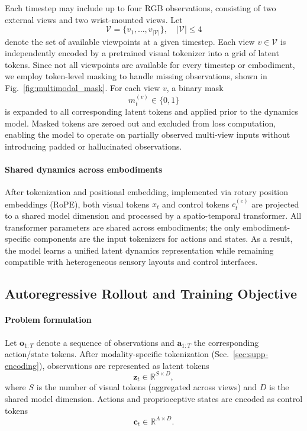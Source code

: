 Each timestep may include up to four RGB observations, consisting of two external views and two wrist-mounted views. Let
\[
\mathcal{V} = \{v_1, \dots, v_{|\mathcal{V}|}\}, \quad |\mathcal{V}| \leq 4
\]
denote the set of available viewpoints at a given timestep. Each view $v \in \mathcal{V}$ is independently encoded by a pretrained visual tokenizer into a grid of latent tokens. Since not all viewpoints are available for every timestep or embodiment, we employ token-level masking to handle missing observations, shown in Fig.~\ref{fig:multimodal_mask}. For each view $v$, a binary mask
\[
m_t^{(v)} \in \{0,1\}
\]
is expanded to all corresponding latent tokens and applied prior to the dynamics model. Masked tokens are zeroed out and excluded from loss computation, enabling the model to operate on partially observed multi-view inputs without introducing padded or hallucinated observations.




\paragraph{Shared dynamics across embodiments}
After tokenization and positional embedding, implemented via rotary position embeddings (RoPE), both visual tokens $x_t$ and control tokens $c_t^{(e)}$ are projected to a shared model dimension and processed by a spatio-temporal transformer. All transformer parameters are shared across embodiments; the only embodiment-specific components are the input tokenizers for actions and states. As a result, the model learns a unified latent dynamics representation while remaining compatible with heterogeneous sensory layouts and control interfaces.







\subsection{Autoregressive Rollout and Training Objective}
\label{sec:supp-rollout-loss}

\paragraph{Problem formulation}
Let $\mathbf{o}_{1:T}$ denote a sequence of observations and $\mathbf{a}_{1:T}$ the corresponding action/state tokens. After modality-specific tokenization (Sec.~\ref{sec:supp-encoding}), observations are represented as latent tokens
\[
\mathbf{z}_t \in \mathbb{R}^{S \times D},
\]
where $S$ is the number of visual tokens (aggregated across views) and $D$ is the shared model dimension. Actions and proprioceptive states are encoded as control tokens
\[
\mathbf{c}_t \in \mathbb{R}^{A \times D}.
\]

